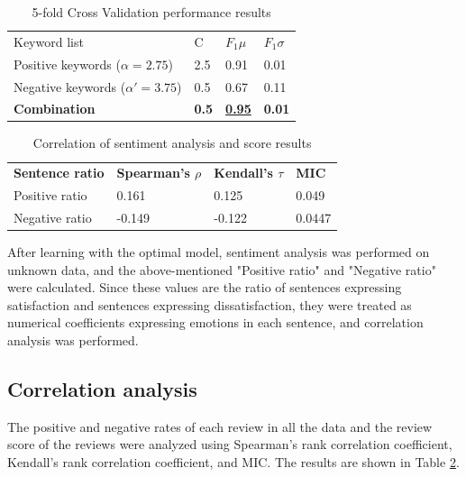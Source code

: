 \documentclass[review]{elsarticle}
\begin{document}
\begin{table}[th]
\centering
\caption{5-fold Cross Validation performance results}
\label{tab:kfold_performance}
\begin{tabular}{llll}
Keyword list                & C            & \(F_1 \mu\)       & \(F_1 \sigma\) \\
Positive keywords (\(\alpha=2.75\))  & 2.5          & 0.91                & 0.01           \\
Negative keywords (\(\alpha'=3.75\)) & 0.5          & 0.67                & 0.11           \\
\rowcolor{DeepGreen}\color{white}\textbf{Combination}
                                     & \textbf{0.5} & {\ul \textbf{0.95}} & \textbf{0.01}
\end{tabular}
\end{table}

\begin{table}[th]
\centering
\caption{Correlation of sentiment analysis and score results}
\label{tab:res_correl}
\begin{tabular}{llll}
\textbf{Sentence ratio} & \textbf{Spearman's \(\rho\)} & \textbf{Kendall's \(\tau\)} & \textbf{MIC} \\
Positive ratio     & 0.161            & 0.125            & 0.049        \\
Negative ratio     & -0.149           & -0.122           & 0.0447      
\end{tabular}
\end{table}

After learning with the optimal model, sentiment analysis was performed on unknown data, and the above-mentioned "Positive ratio" and "Negative ratio" were calculated. Since these values are the ratio of sentences expressing satisfaction and sentences expressing dissatisfaction, they were treated as numerical coefficients expressing emotions in each sentence, and correlation analysis was performed.

\subsection{Correlation analysis}\label{res_correls}

The positive and negative rates of each review in all the data and the review score of the reviews were analyzed using Spearman's rank correlation coefficient, Kendall's rank correlation coefficient, and MIC. The results are shown in Table \ref{tab:res_correl}.
\end{document}

